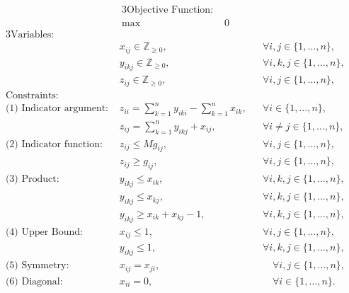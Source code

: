 \documentclass[10pt]{beamer}
\begin{document}
\begin{frame}
    \scriptsize
    \begin{alignat}{3}
        \text{Objective Function: } & \nonumber \\
        \max \quad & 0 \label{eq::integer_objective_function}
        \end{alignat}
        \begin{alignat}{3}
        \text{Variables: } & \nonumber \\ 
        & x_{ij} \in \mathbb{Z}_{\geq 0}, 
        && \forall i,j \in \{1, \dots, n\}, \label{eq::IP_x_variable} \\ 
        & y_{ikj} \in \mathbb{Z}_{\geq 0}, 
        && \forall i,k,j \in \{1, \dots, n\}, \label{eq::IP_y_variable} \\
        & z_{ij} \in \mathbb{Z}_{\geq 0}, 
        && \forall i,j \in \{1, \dots, n\}, \label{eq::IP_z_variable} \\
        \text{Constraints: } & \nonumber \\
        \text{(1) Indicator argument: } 
        & z_{ii} = \sum_{k = 1}^{n}y_{iki} - \sum_{k = 1}^{n} x_{ik}, 
        && \forall i \in \{1, \dots, n\}, \label{eq::IP_fund_matrix} \\
        & z_{ij} = \sum_{k = 1}^{n}y_{ikj} + x_{ij}, 
        && \forall i \neq j \in \{1, \dots, n\}, \label{eq::IP_indicator_arg} \\
        \text{(2) Indicator function: } 
        & z_{ij} \leq M g_{ij}, 
        && \forall i, j \in \{1, \dots, n\}, \label{eq::IP_indicator_upper} \\
        & z_{ij} \geq g_{ij}, 
        && \forall i, j \in \{1, \dots, n\}, \label{eq::IP_indicator_lower}\\
        \text{(3) Product: } 
        & y_{ikj} \leq x_{ik}, 
        && \forall i, k, j \in \{1, \dots, n\}, \label{eq::IP_product_upper_first} \\
        & y_{ikj} \leq x_{kj}, 
        && \forall i, k, j \in \{1, \dots, n\}, \label{eq::IP_product_upper_second} \\
        & y_{ikj} \geq x_{ik} + x_{kj} - 1, 
        && \forall i, k, j \in \{1, \dots, n\}, \label{eq::IP_product_lower} \\
        \text{(4) Upper Bound: } 
        & x_{ij} \leq 1, 
        && \forall i, j \in \{1, \dots, n\}, \label{eq::IP_x_upper_bound} \\
        & y_{ikj} \leq 1, 
        && \forall i, k, j \in \{1, \dots, n\}, \label{eq::IP_y_upper_bound} \\
        \text{(5) Symmetry: } 
        & x_{ij} = x_{ji}, 
        &&\quad \forall i,j \in \{1, \dots, n\}, \label{eq::IP_symmetry_x} \\
        \text{(6) Diagonal: } 
        & x_{ii} = 0, 
        &&\quad \forall i \in \{1, \dots, n\}.  \label{eq::IP_diagonal_x} 
    \end{alignat} \label{eq::integer_program}
\end{frame}
\end{document}
